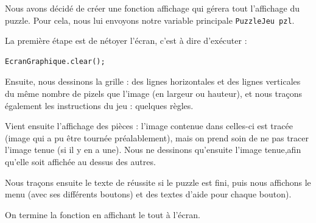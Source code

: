 \documentclass[]{article}
\newcommand{\variable}[1]{\noindent \texttt{#1}}
\begin{document}
Nous avons décidé de créer une fonction affichage qui gérera tout l'affichage du puzzle. Pour cela, nous lui envoyons notre variable principale \variable{PuzzleJeu pzl}.

La première étape est de nétoyer l'écran, c'est à dire d'exécuter : 
\begin{lstlisting}
EcranGraphique.clear();
\end{lstlisting}

Ensuite, nous dessinons la grille : des lignes horizontales et des lignes verticales du même nombre de pizels que l'image (en largeur ou hauteur), et nous traçons également les instructions du jeu : quelques règles.

Vient ensuite l'affichage des pièces : l'image contenue dans celles-ci est tracée (image qui a pu être tournée préalablement), mais on prend soin de ne pas tracer l'image tenue (si il y en a une). Nous ne dessinons qu'ensuite l'image tenue,afin qu'elle soit affichée au dessus des autres.

Nous traçons ensuite le texte de réussite si le puzzle est fini, puis nous affichons le menu (avec ses différents boutons) et des textes d'aide pour chaque bouton).

On termine la fonction en affichant le tout à l'écran. 

\end{document}
